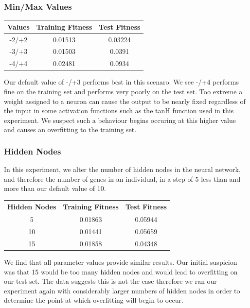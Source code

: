 \documentclass[sigconf]{acmart}
\begin{document}
\subsubsection{Min/Max Values}
\begin{center}
\begin{tabular} {|c|c|c|}
\hline
Values& Training Fitness & Test Fitness \\
\hline
-2/+2 & 0.01513 & 0.03224 \\
-3/+3 & 0.01503 & 0.0391 \\
-4/+4 & 0.02481 & 0.0934 \\

\hline
\end{tabular}
\end{center}
Our default value of -/+3 performs best in this scenaro. We see -/+4 performs fine on the training set and performs very poorly on the test set. Too extreme a weight assigned to a neuron can cause the output to be nearly fixed regardless of the input in some activation functions such as the tanH function used in this experiment. We suspect such a behaviour begins occuring at this higher value and causes an overfitting to the training set.


\subsubsection{Hidden Nodes}
In this experiment, we alter the number of hidden nodes in the neural network, and therefore the number of genes in an individual, in a step of 5 less than and more than our default value of 10.

\begin{center}
\begin{tabular} {|c|c|c|}
\hline
Hidden Nodes & Training Fitness & Test Fitness \\
\hline
5 & 0.01863 & 0.05944 \\
10 & 0.01441 & 0.05659 \\
15 & 0.01858 & 0.04348 \\

\hline

\end{tabular}
\end{center}

We find that all parameter values provide similar results. Our initial suspicion was that 15 would be too many hidden nodes and would lead to overfitting on our test set. The data suggests this is not the case therefore we ran our experiment again with considerably larger numbers of hidden nodes in order to determine the point at which overfitting will begin to occur.
\end{document}
